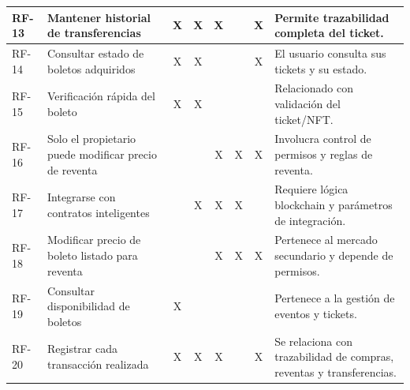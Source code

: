 \documentclass[12pt,letterpaper]{article}
\begin{document}
\begin{table}[htbp]
\begin{tabularx}{\textwidth}{|p{1.2cm}|X|c|c|c|c|c|X|}
RF-13 & Mantener historial de transferencias & X & X & X &  & X & Permite trazabilidad completa del ticket. \\ \hline
RF-14 & Consultar estado de boletos adquiridos & X & X &  &  & X & El usuario consulta sus tickets y su estado. \\ \hline
RF-15 & Verificación rápida del boleto & X & X &  &  &  & Relacionado con validación del ticket/NFT. \\ \hline
RF-16 & Solo el propietario puede modificar precio de reventa &  &  & X & X & X & Involucra control de permisos y reglas de reventa. \\ \hline
RF-17 & Integrarse con contratos inteligentes &  & X & X & X &  & Requiere lógica blockchain y parámetros de integración. \\ \hline
RF-18 & Modificar precio de boleto listado para reventa &  &  & X & X & X & Pertenece al mercado secundario y depende de permisos. \\ \hline
RF-19 & Consultar disponibilidad de boletos & X &  &  &  &  & Pertenece a la gestión de eventos y tickets. \\ \hline
RF-20 & Registrar cada transacción realizada & X & X & X &  & X & Se relaciona con trazabilidad de compras, reventas y transferencias. \\ \hline

\end{tabularx}
\normalsize
\end{table}
\end{document}
